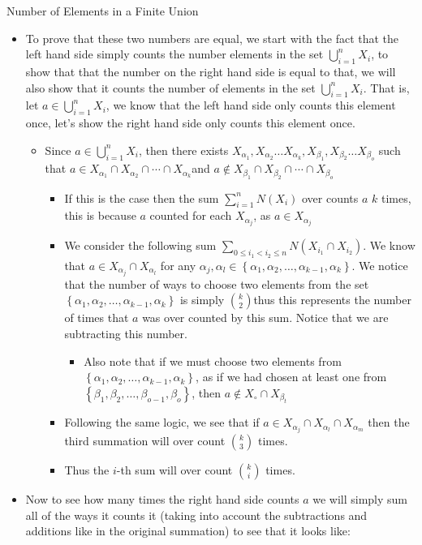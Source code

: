 \documentclass{standalone}
\begin{document}
\begin{theo*}{Number of Elements in a Finite Union}
\begin{pf}
\begin{itemize}
  \item To prove that these two numbers are equal, we start with the fact that the left hand side simply counts the number elements in the set $\bigcup_{i=1}^{n} X_{i}$, to show that that the number on the right hand side is equal to that, we will also show that it counts the number of elements in the set $\bigcup_{i=1}^{n} X_{i}$. That is, let $a \in  \bigcup_{i=1}^{n} X_{i}$, we know that the left hand side only counts this element once, let's show the right hand side only counts this element once.
  \begin{itemize}
    \item Since $a \in  \bigcup_{i=1}^{n} X_{i}$, then there exists $X_{\alpha_{1}}, X _{\alpha_{2}} \ldots X_{\alpha_{k}}, X_{\beta_{1}}, X _{\beta{_2}} \ldots X_{\beta_{o}} $ such that $a \in X_{\alpha_{1}} \cap X _{\alpha_{2}} \cap \dotsb \cap X_{\alpha_{k}}  $and $a \not\in X_{\beta_{1}} \cap X _{\beta_{2}} \cap \dotsb \cap X_{\beta_{o}}  $
    \begin{itemize}
      \item If this is the case then the sum $\sum_{i=1}^{n} N\left(X_{i}\right)$ over counts $a$ ${k}$ times, this is because $a$ counted for each $X_{\alpha_{j}}$, as $a \in X_{\alpha_{j}}$
      \item We consider the following sum $\sum_{0 \le i_{1} < i_{2} \le n} N\left(X_{i_{1}} \cap X_{i_{2}}\right)$. We know that $a \in X_{\alpha_{j}} \cap X_{\alpha_{l}}$ for any $\alpha_{j}, \alpha_{l} \in \left\{ \alpha_{1} , \alpha_{2} , \dotsc  , \alpha_{k - 1} , \alpha_{k} \right\} $. We notice that the number of ways to choose two elements from the set $\left\{ \alpha_{1} , \alpha_{2} , \dotsc  , \alpha_{k - 1} , \alpha_{k} \right\}$ is simply $\binom{{k}}{2}$thus this represents the number of times that $a$ was over counted by this sum. Notice that we are subtracting this number.
      \begin{itemize}
        \item Also note that if we must choose two elements from $\left\{ \alpha_{1} , \alpha_{2} , \dotsc  , \alpha_{k - 1} , \alpha_{k} \right\}$, as if we had chosen at least one from $\left\{ \beta_{1} , \beta_{2} , \dotsc  , \beta_{o - 1} , \beta_{o} \right\}$, then $a \not\in X_{\circ} \cap X_{\beta_t}$
      \end{itemize}
      \item Following the same logic, we see that if $a \in X_{\alpha_{j}} \cap X_{\alpha_{l}} \cap X_{\alpha_{m}}$ then the third summation will over count $\binom{{k}}{3}$ times.
      \item Thus the $i$-th sum will over count $\binom{{k}}{i}$ times.
    \end{itemize}
  \end{itemize}
  \item Now to see how many times the right hand side counts $a$ we will simply sum all of the ways it counts it (taking into account the subtractions and additions like in the original summation) to see that it looks like:


\end{itemize}
\end{pf}
\end{theo*}
\end{document}
